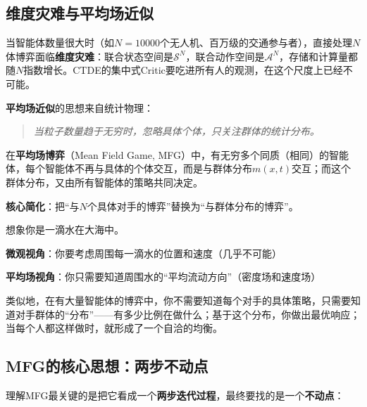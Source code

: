 \subsection{维度灾难与平均场近似}

当智能体数量很大时（如$N = 10000$个无人机、百万级的交通参与者），直接处理$N$体博弈面临\textbf{维度灾难}：联合状态空间是$\mathcal{S}^N$，联合动作空间是$\mathcal{A}^N$，存储和计算量都随$N$指数增长。CTDE的集中式Critic要吃进所有人的观测，在这个尺度上已经不可能。

\textbf{平均场近似}的思想来自统计物理：

\begin{quote}
\textit{当粒子数量趋于无穷时，忽略具体个体，只关注群体的统计分布。}
\end{quote}


\begin{definition}[平均场博弈]
在\textbf{平均场博弈}（Mean Field Game, MFG）中，有无穷多个同质（相同）的智能体，每个智能体不再与具体的个体交互，而是与群体分布$m(x, t)$交互；而这个群体分布，又由所有智能体的策略共同决定。

\textbf{核心简化}：把``与$N$个具体对手的博弈''替换为``与群体分布的博弈''。
\end{definition}

\begin{example}[平均场近似的直观理解]
想象你是一滴水在大海中。

\textbf{微观视角}：你要考虑周围每一滴水的位置和速度（几乎不可能）

\textbf{平均场视角}：你只需要知道周围水的“平均流动方向”（密度场和速度场）

类似地，在有大量智能体的博弈中，你不需要知道每个对手的具体策略，只需要知道对手群体的“分布”——有多少比例在做什么；基于这个分布，你做出最优响应；当每个人都这样做时，就形成了一个自洽的均衡。
\end{example}

\subsection{MFG的核心思想：两步不动点}

理解MFG最关键的是把它看成一个\textbf{两步迭代过程}，最终要找的是一个\textbf{不动点}：

